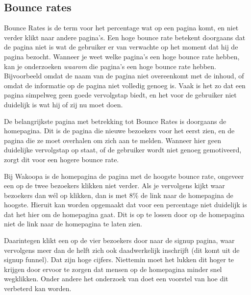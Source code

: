 \documentclass[a4paper, 10pt, pdftex]{report}
\begin{document}
    \subsection{Bounce rates}
    Bounce Rates is de term voor het percentage wat op een pagina komt, en niet verder klikt naar andere pagina's. Een hoge bounce rate betekent doorgaans dat de pagina niet is wat de gebruiker er van verwachte op het moment dat hij de pagina bezocht. Wanneer je weet welke pagina's een hoge bounce rate hebben, kan je onderzoeken \emph{waarom} die pagina's een hoge bounce rate hebben. Bijvoorbeeld omdat de naam van de pagina niet overeenkomt met de inhoud, of omdat de informatie op de pagina niet volledig genoeg is. Vaak is het zo dat een pagina simpelweg geen goede vervolgstap biedt, en het voor de gebruiker niet duidelijk is wat hij of zij nu moet doen.

    De belangrijkste pagina met betrekking tot Bounce Rates is doorgaans de homepagina. Dit is de pagina die nieuwe bezoekers voor het eerst zien, en de pagina die ze moet overhalen om zich aan te melden. Wanneer hier geen duidelijke vervolgstap op staat, of de gebruiker wordt niet genoeg gemotiveerd, zorgt dit voor een hogere bounce rate.

    Bij Wakoopa is de homepagina de pagina met de hoogste bounce rate, ongeveer een op de twee bezoekers klikken niet verder. Als je vervolgens kijkt waar bezoekers dan w\'el op klikken, dan is met 8\% de link naar de homepagina de hoogste. Hieruit kan worden opgemaakt dat voor een percentage niet duidelijk is dat het hier om de homepagina gaat. Dit is op te lossen door op de homepagina niet de link naar de homepagina te laten zien.

    Daarintegen klikt een op de vier bezoekers door naar de signup pagina, waar vervolgens meer dan de helft zich ook daadwerkelijk inschrijft (dit komt uit de signup funnel). Dat zijn hoge cijfers. Niettemin moet het lukken dit hoger te krijgen door ervoor te zorgen dat mensen op de homepagina minder snel wegklikken. Onder andere het onderzoek van \cite{Hoekman2008} doet een voorstel van hoe dit verbeterd kan worden.
\end{document}
